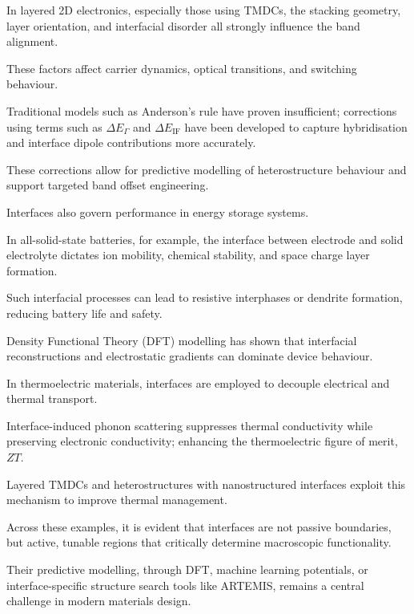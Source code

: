\label{para:tmdc_interface_band_alignment} %

In layered 2D electronics, especially those using TMDCs, the stacking geometry, layer
orientation, and interfacial disorder all strongly influence the band alignment\cite{Davies2024-ju}.

These factors affect carrier dynamics, optical transitions, and switching behaviour.

Traditional models such as Anderson's rule have proven insufficient; corrections using terms such as $\Delta E_\Gamma$ and
$\Delta E_{\text{IF}}$ have been developed to capture hybridisation and interface dipole contributions more accurately\cite{Butler2019-ws}.


These corrections allow for predictive modelling of heterostructure behaviour and support targeted band offset
engineering.

\label{para:energy_storage_interface} %

Interfaces also govern performance in energy storage systems\cite{Leitherer2023-ew}.

In all-solid-state batteries, for example, the interface between electrode and solid electrolyte dictates ion mobility,
chemical stability, and space charge layer formation\cite{Leung2020-tv, Butler2019-ws}.

Such interfacial processes can lead to resistive interphases or dendrite formation, reducing battery life and safety\cite{Butler2019-ws, Leung2020-tv}.

Density Functional Theory (DFT) modelling has shown that interfacial reconstructions and electrostatic gradients can
dominate device behaviour\cite{Butler2019-ws, Leung2020-tv}.

\label{para:thermoelectric_interface} %

In thermoelectric materials, interfaces are employed to decouple electrical and thermal transport\cite{Leitherer2023-ew}.

Interface-induced phonon scattering suppresses thermal conductivity while preserving electronic conductivity; enhancing
the thermoelectric figure of merit, $ZT$\cite{Hepplestone2010-vw}.

Layered TMDCs and heterostructures with nanostructured interfaces exploit this mechanism to improve thermal management\cite{Low2025-on}.

\label{para:interfaces_active_modelling_challenge} %

Across these examples, it is evident that interfaces are not passive boundaries, but active, tunable regions that
critically determine macroscopic functionality\cite{Leitherer2023-ew, Di_Liberto2022-gz}.

Their predictive modelling, through DFT, machine learning potentials, or interface-specific structure search tools like
ARTEMIS, remains a central challenge in modern materials design\cite{}.

